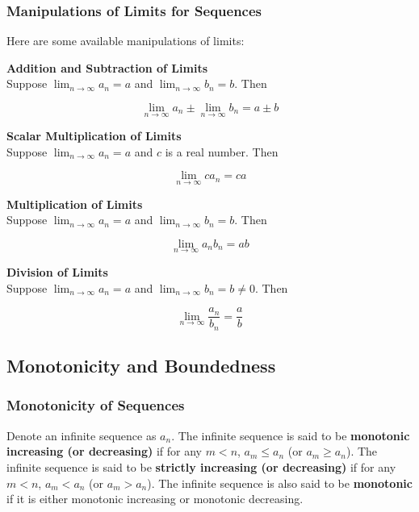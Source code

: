 \documentclass[a4paper,12pt]{article}
\begin{document}
\subsubsection{Manipulations of Limits for Sequences}
\begin{thm}
  Here are some available manipulations of limits:
  \begin{alist}
   \item \textbf{Addition and Subtraction of Limits}\\
   Suppose $\lim_{n\to \infty}a_{n}=a$ and $\lim_{n\to \infty}b_{n}=b$. Then

   $$\lim_{n\to \infty}a_{n}\pm \lim_{n\to \infty}b_{n}=a\pm b$$

   \item \textbf{Scalar Multiplication of Limits}\\
   Suppose $\lim_{n\to \infty}a_{n}=a$ and $c$ is a real number. Then

   $$\lim_{n\to \infty}ca_{n}=ca$$

   \item \textbf{Multiplication of Limits}\\
   Suppose $\lim_{n\to \infty}a_{n}=a$ and $\lim_{n\to \infty}b_{n}=b$. Then

   $$\lim_{n\to \infty}a_{n}b_{n}=ab$$

   \item \textbf{Division of Limits}\\
   Suppose $\lim_{n\to \infty}a_{n}=a$ and $\lim_{n\to \infty}b_{n}=b\neq 0$. Then

   $$\lim_{n\to \infty}\frac{a_{n}}{b_{n}}=\frac{a}{b}$$
  \end{alist}
\end{thm}

\subsection{Monotonicity and Boundedness}
\subsubsection{Monotonicity of Sequences}
\begin{dft}
  Denote an infinite sequence as $a_{n}$. The infinite sequence is said to be \textbf{monotonic increasing (or decreasing)} if for any $m<n$, $a_{m}\leq a_{n}$ (or $a_{m}\geq a_{n}$). The infinite sequence is said to be \textbf{strictly increasing (or decreasing)} if for any $m<n$, $a_{m}<a_{n}$ (or $a_{m}>a_{n}$). The infinite sequence is also said to be \textbf{monotonic} if it is either monotonic increasing or monotonic decreasing.
\end{dft}
\end{document}
